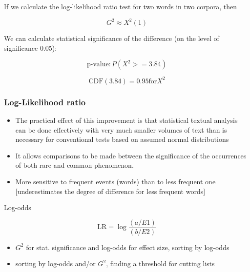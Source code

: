\documentclass[svgnames]{beamer}
\begin{document}
\begin{frame}
  If we calculate the log-likelihood ratio test for two words in two corpora, then


    $$G^2 \approx X^2(1)$$


      We can calculate statistical significance of the difference (on the level of significance 0.05):

      $$\text{p-value}: P(X^2 >= 3.84)$$

      $$\text{CDF}(3.84) = 0.95 \text{for} X^2$$

\end{frame}

\begin{frame}
  \frametitle{Log-Likelihood ratio}

  \begin{itemize}
    \item The practical effect of this improvement is that  statistical textual analysis can be done
  effectively with very much smaller volumes of text than is necessary for conventional tests based on assumed normal distributions
  \item It allows comparisons to be made between the significance of the occurrences of both rare and common phenomenon.
  \item More sensitive to frequent events (words) than to less frequent one [underestimates the degree of difference for less frequent words]
  \end{itemize}
\end{frame}

\begin{frame}{Log-odds}

  $$\text{LR} = \log\frac{(a/E1)}{(b/E2)}$$

\end{frame}


\begin{frame}
  \begin{itemize}
    \item $G^2$ for stat. significance and log-odds for effect size, sorting by log-odds
    \item sorting by log-odds and/or $G^2$, finding a threshold for cutting lists
\end{itemize}
\end{frame}


%
%
%
\end{document}
